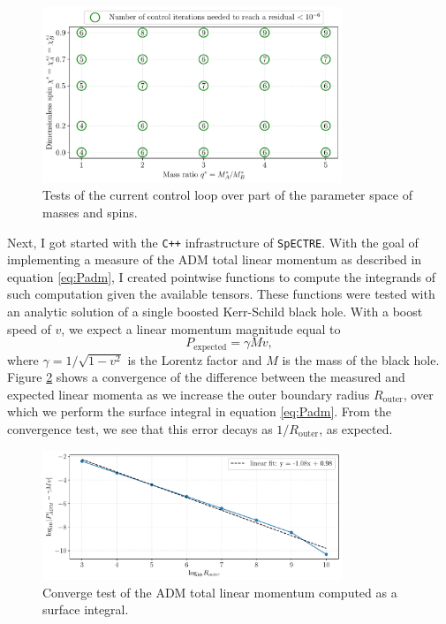 \documentclass{../document}
\begin{document}
  \begin{figure}
    \centering
    \includegraphics[width=0.8\textwidth]{assets/control_iterations_over_parameter_space.pdf}
    \caption{Tests of the current control loop over part of the parameter space of masses and spins.}
    \label{fig:control-tests}
  \end{figure}

  Next, I got started with the {\tt C++} infrastructure of {\tt SpECTRE}. With the goal of implementing a measure of the ADM total linear momentum as described in equation \eqref{eq:Padm}, I created pointwise functions to compute the integrands of such computation given the available tensors. These functions were tested with an analytic solution of a single boosted Kerr-Schild black hole. With a boost speed of $v$, we expect a linear momentum magnitude equal to
  \begin{equation}
    P_\text{expected} = \gamma M v,
  \end{equation}
  where $\gamma = 1/\sqrt{1-v^2}$ is the Lorentz factor and $M$ is the mass of the black hole. Figure \ref{fig:momentum-convergence} shows a convergence of the difference between the measured and expected linear momenta as we increase the outer boundary radius $R_\text{outer}$, over which we perform the surface integral in equation \eqref{eq:Padm}. From the convergence test, we see that this error decays as $1/R_\text{outer}$, as expected.

  \begin{figure}
    \centering
    \includegraphics[width=0.8\textwidth]{assets/adm_linear_momentum_residual_vs_distance.pdf}
    \caption{Converge test of the ADM total linear momentum computed as a surface integral.}
    \label{fig:momentum-convergence}
  \end{figure}
\end{document}
